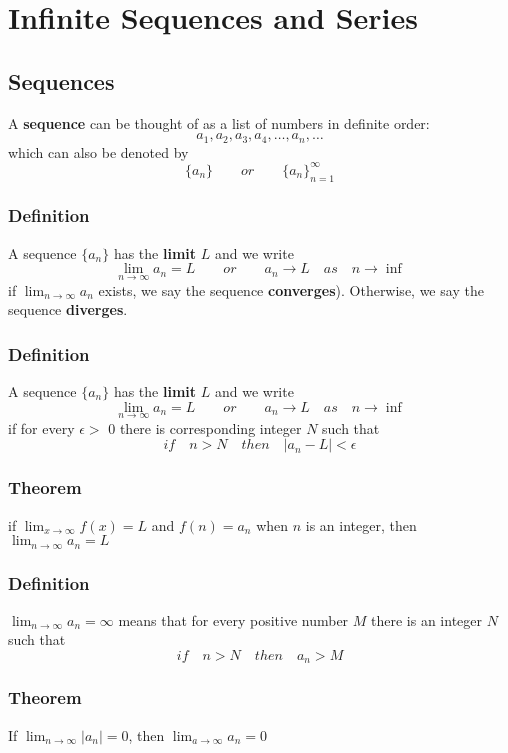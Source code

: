 \chapter{Infinite Sequences and Series}

\section{Sequences}
A \textbf{sequence} can be thought of as a list of numbers in definite order:
$$ a_1, a_2, a_3, a_4, \dots, a_n,\dots $$
which can also be denoted by
$$ \{a_n\} \qquad or \qquad \{a_n\}_{n=1}^\infty $$

\subsection*{Definition}
A sequence $\{a_n\}$ has the \textbf{limit} $L$ and we write
$$ \lim_{n \to \infty}a_n = L \qquad or \qquad a_n \rightarrow L \quad as \quad n \rightarrow \inf $$
if $\lim_{n \to \infty}a_n$ exists, we say the sequence \textbf{converges}).
Otherwise, we say the sequence \textbf{diverges}.

\subsection*{Definition}
A sequence $\{a_n\}$ has the \textbf{limit} $L$ and we write
$$ \lim_{n \to \infty}a_n = L \qquad or \qquad a_n \rightarrow L \quad as \quad n \rightarrow \inf $$
if for every $\epsilon >$ 0 there is corresponding integer $N$ such that
$$ if \quad n>N \quad then \quad |a_n - L|<\epsilon $$

\subsection*{Theorem}
if $\lim_{x \to \infty}f(x)=L$ and $f(n)=a_n$ when $n$ is an integer,
then $\lim_{n \to \infty}a_n=L$

\subsection*{Definition}
$\lim_{n \to \infty}a_n=\infty$ means that for every positive number $M$
there is an integer $N$ such that
$$ if \quad n>N \quad then \quad a_n>M $$

\subsection*{Theorem}
If $\lim_{n \to \infty}|a_n|=0$, then $\lim_{a \to \infty}a_n=0$

